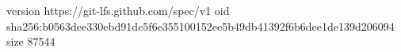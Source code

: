 version https://git-lfs.github.com/spec/v1
oid sha256:b0563dee330ebd91dc5f6e355100152ee5b49db41392f6b6dee1de139d206094
size 87544
